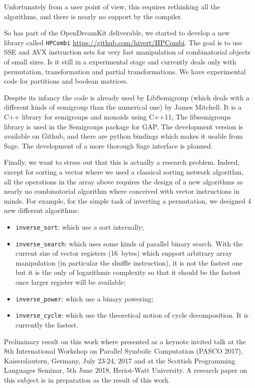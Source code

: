 \documentclass{deliverablereport}
\begin{document}
Unfortunately from a user point of view, this requires rethinking all the
algorithms, and there is nearly no support by the compiler.\bigskip

So has part of the OpenDreamKit deliverable, we started to develop a new
library called \texttt{HPCombi} \url{https://github.com/hivert/HPCombi}. The
goal is to use SSE and AVX instruction sets for very fast manipulation of
combinatorial objects of small sizes. Is it still in a experimental stage and
currently deals only with permutation, transformation and partial
transformations. We have experimental code for partitions and boolean
matrices.

Despite its infancy the code is already used by LibSemigroup
\cite{libsemigroup} (which deals with a different kinds of semigroup than the
numerical one) by James Mitchell. It is a C++ library for semigroups and
monoids using C++11; The libsemigroups library is used in the Semigroups
package for GAP. The development version is available on Github, and there are
python bindings which makes it usable from Sage. The development of a more
thorough Sage interface is planned.
\bigskip

Finally, we want to stress out that this is actually a research
problem. Indeed, except for sorting a vector where we used a classical sorting
network algorithm, all the operations in the array above requires the design
of a new algorithms as nearly no combinatorial algorithm where conceived with
vector instructions in minds. For example, for the simple task of inverting a
permutation, we designed 4 new different algorithms:
\begin{itemize}
\item \verb|inverse_sort|: which use a sort internally;
\item \verb|inverse_search|: which uses some kinds of parallel binary
  search. With the current size of vector registers ($16$~bytes) which support
  arbitrary array manipulation (in particular the shuffle instruction), it is
  not the fastest one but it is the only of logarithmic complexity so that it
  should be the fastest once larger register will be available;
\item \verb|inverse_power|: which use a binary powering;
\item \verb|inverse_cycle|: which use the theoretical notion of cycle
  decomposition. It is currently the fastest.
\end{itemize}
Preliminary result on this work where presented as a keynote invited talk at
the 8th International Workshop on Parallel Symbolic Computation (PASCO 2017),
Kaiserslautern, Germany, July 23-24, 2017 and at the Scottish Programming
Languages Seminar, 5th June 2018, Heriot-Watt University. A research paper on
this subject is in preparation as the result of this work.
\end{document}

